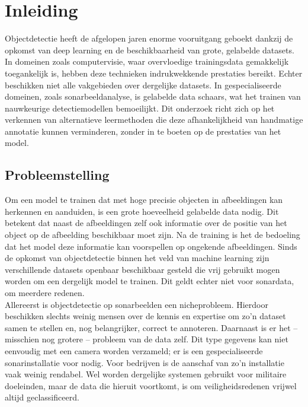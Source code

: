 
\chapter{Inleiding}%
\label{ch:inleiding}

Objectdetectie heeft de afgelopen jaren enorme vooruitgang geboekt dankzij de opkomst van deep learning en de beschikbaarheid van grote, gelabelde datasets. In domeinen zoals computervisie, waar overvloedige trainingsdata gemakkelijk toegankelijk is, hebben deze technieken indrukwekkende prestaties bereikt. Echter beschikken niet alle vakgebieden over dergelijke datasets. In gespecialiseerde domeinen, zoals sonarbeeldanalyse, is gelabelde data schaars, wat het trainen van nauwkeurige detectiemodellen bemoeilijkt. Dit onderzoek richt zich op het verkennen van alternatieve leermethoden die deze afhankelijkheid van handmatige annotatie kunnen verminderen, zonder in te boeten op de prestaties van het model.

\section{Probleemstelling}%
\label{sec:probleemstelling}

Om een model te trainen dat met hoge precisie objecten in afbeeldingen kan herkennen en aanduiden, is een grote hoeveelheid gelabelde data nodig. Dit betekent dat naast de afbeeldingen zelf ook informatie over de positie van het object op de afbeelding beschikbaar moet zijn. Na de training is het de bedoeling dat het model deze informatie kan voorspellen op ongekende afbeeldingen. Sinds de opkomst van objectdetectie binnen het veld van machine learning zijn verschillende datasets openbaar beschikbaar gesteld die vrij gebruikt mogen worden om een dergelijk model te trainen. Dit geldt echter niet voor sonardata, om meerdere redenen. \\

Allereerst is objectdetectie op sonarbeelden een nicheprobleem. Hierdoor beschikken slechts weinig mensen over de kennis en expertise om zo’n dataset samen te stellen en, nog belangrijker, correct te annoteren. Daarnaast is er het -- misschien nog grotere -- probleem van de data zelf. Dit type gegevens kan niet eenvoudig met een camera worden verzameld; er is een gespecialiseerde sonarinstallatie voor nodig. Voor bedrijven is de aanschaf van zo’n installatie vaak weinig rendabel. Wel worden dergelijke systemen gebruikt voor militaire doeleinden, maar de data die hieruit voortkomt, is om veiligheidsredenen vrijwel altijd geclassificeerd. \\

